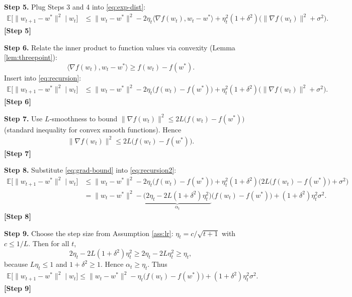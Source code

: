 \documentclass{article}
\newcommand{\E}{\mathbb{E}}
\begin{document}
\noindent\textbf{Step 5.}  Plug Steps 3 and 4 into \eqref{eq:exp-dist}:
\begin{align}
\E\!\big[\|w_{t+1}-w^{*}\|^{2}\mid w_{t}\big]
&\le\|w_{t}-w^{*}\|^{2}
-2\eta_{t}\langle\nabla f(w_{t}),w_{t}-w^{*}\rangle
+\eta_{t}^{2}(1+\delta^{2})\big(\|\nabla f(w_{t})\|^{2}+\sigma^{2}\big).
\label{eq:recursion}
\end{align}
\noindent\textbf{[Step 5]}

\noindent\textbf{Step 6.}  Relate the inner product to function values via convexity (Lemma \ref{lem:threepoint}):
\[
\langle\nabla f(w_{t}),w_{t}-w^{*}\rangle\ge f(w_{t})-f(w^{*}).
\]
Insert into \eqref{eq:recursion}:
\begin{align}
\E\!\big[\|w_{t+1}-w^{*}\|^{2}\mid w_{t}\big]
&\le\|w_{t}-w^{*}\|^{2}
-2\eta_{t}\big(f(w_{t})-f(w^{*})\big)
+\eta_{t}^{2}(1+\delta^{2})\big(\|\nabla f(w_{t})\|^{2}+\sigma^{2}\big).
\label{eq:recursion2}
\end{align}
\noindent\textbf{[Step 6]}

\noindent\textbf{Step 7.}  Use $L$‑smoothness to bound $\|\nabla f(w_{t})\|^{2}\le 2L\big(f(w_{t})-f(w^{*})\big)$ (standard inequality for convex smooth functions). Hence
\begin{align}
\|\nabla f(w_{t})\|^{2}\le 2L\big(f(w_{t})-f(w^{*})\big).
\label{eq:grad-bound}
\end{align}
\noindent\textbf{[Step 7]}

\noindent\textbf{Step 8.}  Substitute \eqref{eq:grad-bound} into \eqref{eq:recursion2}:
\begin{align}
\E\!\big[\|w_{t+1}-w^{*}\|^{2}\mid w_{t}\big]
&\le\|w_{t}-w^{*}\|^{2}
-2\eta_{t}\big(f(w_{t})-f(w^{*})\big)
+\eta_{t}^{2}(1+\delta^{2})\big(2L\big(f(w_{t})-f(w^{*})\big)+\sigma^{2}\big)\nonumber\\
&=\|w_{t}-w^{*}\|^{2}
-\underbrace{\big(2\eta_{t}-2L(1+\delta^{2})\eta_{t}^{2}\big)}_{\displaystyle \alpha_{t}}
\big(f(w_{t})-f(w^{*})\big)
+(1+\delta^{2})\eta_{t}^{2}\sigma^{2}.
\label{eq:recursion3}
\end{align}
\noindent\textbf{[Step 8]}

\noindent\textbf{Step 9.}  Choose the step size from Assumption \ref{ass:lr}: $\eta_{t}=c/\sqrt{t+1}$ with $c\le 1/L$. Then for all $t$,
\[
2\eta_{t}-2L(1+\delta^{2})\eta_{t}^{2}
\ge 2\eta_{t}-2L\eta_{t}^{2}
\ge \eta_{t},
\]
because $L\eta_{t}\le 1$ and $1+\delta^{2}\ge1$. Hence $\alpha_{t}\ge\eta_{t}$.
Thus
\begin{align}
\E\!\big[\|w_{t+1}-w^{*}\|^{2}\mid w_{t}\big]
\le\|w_{t}-w^{*}\|^{2}
-\eta_{t}\big(f(w_{t})-f(w^{*})\big)
+(1+\delta^{2})\eta_{t}^{2}\sigma^{2}.
\label{eq:recursion4}
\end{align}
\noindent\textbf{[Step 9]}
\end{document}
